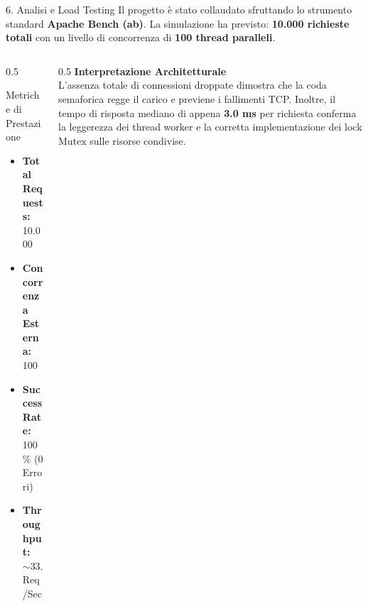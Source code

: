 \documentclass[aspectratio=169, 10pt]{beamer}
\begin{document}
\begin{frame}{6. Analisi e Load Testing}
    Il progetto è stato collaudato sfruttando lo strumento standard \textbf{Apache Bench (ab)}.
    La simulazione ha previsto: \textbf{10.000 richieste totali} con un livello di concorrenza di \textbf{100 thread paralleli}.
    
    \vspace{0.3cm}
    
    \begin{columns}
        \begin{column}{0.5\textwidth}
            \begin{block}{Metriche di Prestazione}
                \begin{itemize}
                    \item \textbf{Total Requests:} 10.000
                    \item \textbf{Concorrenza Esterna:} 100
                    \item \textbf{Success Rate:} 100\% (0 Errori)
                    \item \textbf{Throughput:} $\sim 33.229$ Req/Sec
                \end{itemize}
            \end{block}
        \end{column}
        \begin{column}{0.5\textwidth}
            \textbf{Interpretazione Architetturale} \\
            L'assenza totale di connessioni droppate dimostra che la coda semaforica regge il carico e previene i fallimenti TCP. 
            Inoltre, il tempo di risposta mediano di appena \textbf{3.0 ms} per richiesta conferma la leggerezza dei thread worker e la corretta implementazione dei lock Mutex sulle risorse condivise.
        \end{column}
    \end{columns}
\end{frame}
\end{document}

